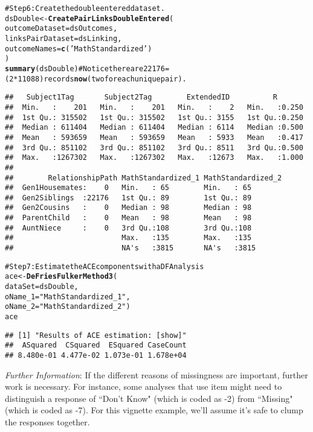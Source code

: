 \documentclass[letterpaper]{article}\usepackage{graphicx, color}
\makeatletter
\newcommand{\hlfunctioncall}[1]{\textcolor[rgb]{0.501960784313725,0,0.329411764705882}{\textbf{#1}}}%
\newcommand{\hlstring}[1]{\textcolor[rgb]{0.6,0.6,1}{#1}}%
\newcommand{\hlcomment}[1]{\textcolor[rgb]{0.180392156862745,0.6,0.341176470588235}{#1}}%
\newenvironment{kframe}{%
 \def\at@end@of@kframe{}%
 \ifinner\ifhmode%
  \def\at@end@of@kframe{\end{minipage}}%
  \begin{minipage}{\columnwidth}%
 \fi\fi%
 \def\FrameCommand##1{\hskip\@totalleftmargin \hskip-\fboxsep
 \colorbox{shadecolor}{##1}\hskip-\fboxsep
     \hskip-\linewidth \hskip-\@totalleftmargin \hskip\columnwidth}%
 \MakeFramed {\advance\hsize-\width
   \@totalleftmargin\z@ \linewidth\hsize
   \@setminipage}}%
 {\par\unskip\endMakeFramed%
 \at@end@of@kframe}
\newenvironment{knitrout}{}{} %
\makeatother
\begin{document}
\begin{knitrout}
\begin{kframe}
\begin{alltt}
\hlcomment{#Step 6: Create the double entered dataset.}
dsDouble <- \hlfunctioncall{CreatePairLinksDoubleEntered}(
  outcomeDataset=dsOutcomes, 
  linksPairDataset=dsLinking,
  outcomeNames=\hlfunctioncall{c}(\hlstring{'MathStandardized'})
)
\hlfunctioncall{summary}(dsDouble) \hlcomment{#Notice there are 22176=(2*11088) records \hlfunctioncall{now} (two for each unique pair).}
\end{alltt}
\begin{verbatim}
##   Subject1Tag       Subject2Tag        ExtendedID          R        
##  Min.   :    201   Min.   :    201   Min.   :    2   Min.   :0.250  
##  1st Qu.: 315502   1st Qu.: 315502   1st Qu.: 3155   1st Qu.:0.250  
##  Median : 611404   Median : 611404   Median : 6114   Median :0.500  
##  Mean   : 593659   Mean   : 593659   Mean   : 5933   Mean   :0.417  
##  3rd Qu.: 851102   3rd Qu.: 851102   3rd Qu.: 8511   3rd Qu.:0.500  
##  Max.   :1267302   Max.   :1267302   Max.   :12673   Max.   :1.000  
##                                                                     
##        RelationshipPath MathStandardized_1 MathStandardized_2
##  Gen1Housemates:    0   Min.   : 65        Min.   : 65       
##  Gen2Siblings  :22176   1st Qu.: 89        1st Qu.: 89       
##  Gen2Cousins   :    0   Median : 98        Median : 98       
##  ParentChild   :    0   Mean   : 98        Mean   : 98       
##  AuntNiece     :    0   3rd Qu.:108        3rd Qu.:108       
##                         Max.   :135        Max.   :135       
##                         NA's   :3815       NA's   :3815
\end{verbatim}
\begin{alltt}

\hlcomment{#Step 7: Estimate the ACE components with a DF Analysis }
ace <- \hlfunctioncall{DeFriesFulkerMethod3}(
    dataSet=dsDouble,  
    oName_1=\hlstring{"MathStandardized_1"}, 
    oName_2=\hlstring{"MathStandardized_2"})
ace
\end{alltt}
\begin{verbatim}
## [1] "Results of ACE estimation: [show]"
##  ASquared  CSquared  ESquared CaseCount 
## 8.480e-01 4.477e-02 1.073e-01 1.678e+04
\end{verbatim}
\end{kframe}
\end{knitrout}


\emph{Further Information}: If the different reasons of missingness are important, further work is necessary.  For instance, some analyses that use item  might need to distinguish a response of ``Don't Know" (which is coded as -2) from ``Missing" (which is coded as -7).  For this vignette example, we'll assume it's safe to clump the responses together.
\end{document}
